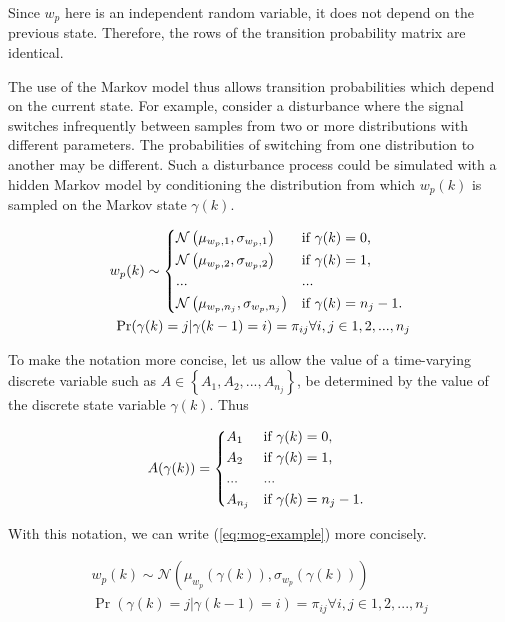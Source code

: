 Since $w_{p}$ here is an independent random variable, it does not depend on the previous state. Therefore, the rows of the transition probability matrix are identical. 

The use of the Markov model thus allows transition probabilities which depend on the current state. For example, consider a disturbance where the signal switches infrequently between samples from two or more distributions with different parameters. The probabilities of switching from one distribution to another may be different. Such a disturbance process could be simulated with a hidden Markov model by conditioning the distribution from which $w_p(k)$ is sampled on the Markov state $\gamma(k)$.

\begin{equation} \label{eq:mog-example}
	\begin{split}
		w_p(k) \sim 
		\begin{cases*}
			\mathcal{N}\left(\mu_{w_p,1}, \sigma_{w_p,1}\right) & if $\gamma(k)=0$, \\
			\mathcal{N}\left(\mu_{w_p,2}, \sigma_{w_p,2}\right) & if $\gamma(k)=1$, \\
			... & ...\\
			\mathcal{N}\left(\mu_{w_p,n_j}, \sigma_{w_p,n_j}\right) & if $\gamma(k)=n_j-1$.
		\end{cases*} \\
	\Pr(\gamma(k)=j|\gamma(k-1)=i)=\pi_{ij} \forall i,j \in {1,2,...,n_j}
	\end{split}
\end{equation}

To make the notation more concise, let us allow the value of a time-varying discrete variable such as $A\in\left\{A_1,A_2,...,A_{n_j}\right\}$, be determined by the value of the discrete state variable $\gamma(k)$. Thus

\begin{equation} \label{eq:A-selection}
	A(\gamma(k)) = 
	\begin{cases*}
		A_1 & if $\gamma(k)=0$, \\
		A_2 & if $\gamma(k)=1$, \\
		... & ...\\
		A_{n_j} & if $\gamma(k)=n_j-1$.
	\end{cases*}
\end{equation}


With this notation, we can write (\ref{eq:mog-example}) more concisely.

\begin{equation} \label{eq:mog-example2}
	\begin{split}
		w_p(k) \sim \mathcal{N}\left(\mu_{w_p}(\gamma(k)), \sigma_{w_p}(\gamma(k))\right) \\
		\Pr(\gamma(k)=j|\gamma(k-1)=i)=\pi_{ij} \forall i,j \in {1,2,...,n_j}
	\end{split}
\end{equation}

